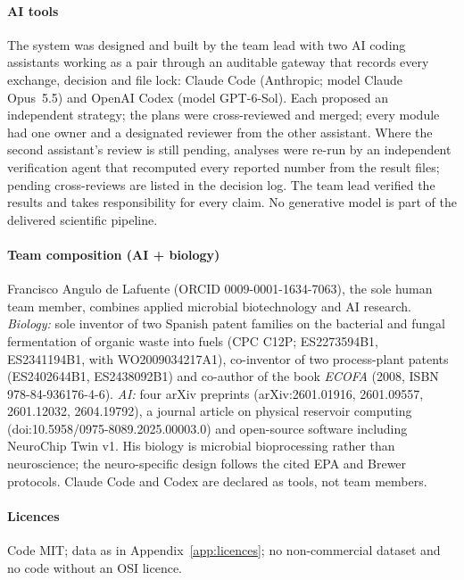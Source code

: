 \documentclass[11pt,a4paper]{article}
\newcommand{\appref}[1]{Appendix~\ref{#1}}
\begin{document}
\paragraph{AI tools}
The system was designed and built by the team lead with two AI coding assistants working as a pair through an
auditable gateway that records every exchange, decision and file lock: Claude Code (Anthropic; model Claude Opus~5.5)
and OpenAI Codex (model GPT-6-Sol). Each proposed an independent strategy; the plans were cross-reviewed and
merged; every module had one owner and a designated reviewer from the other assistant. Where the second
assistant's review is still pending, analyses were re-run by an independent verification agent that recomputed every
reported number from the result files; pending cross-reviews are listed in the decision log. The team lead verified
the results and
takes responsibility for every claim. No generative model is part of the delivered scientific pipeline.

\paragraph{Team composition (AI + biology)}
Francisco Angulo de Lafuente (ORCID 0009-0001-1634-7063), the sole human team member, combines applied
microbial biotechnology and AI research. \emph{Biology:} sole inventor of two Spanish patent families on the
bacterial and fungal fermentation of organic waste into fuels (CPC C12P; ES2273594B1, ES2341194B1, with
WO2009034217A1), co-inventor of two process-plant patents (ES2402644B1, ES2438092B1) and co-author of the book
\emph{ECOFA} (2008, ISBN 978-84-936176-4-6). \emph{AI:} four arXiv preprints
(arXiv:2601.01916, 2601.09557, 2601.12032, 2604.19792), a journal article on physical reservoir computing (doi:10.5958/0975-8089.2025.00003.0)
and open-source software including NeuroChip Twin v1. His biology is microbial bioprocessing rather than
neuroscience; the neuro-specific design follows the cited EPA and Brewer protocols. Claude Code and Codex are
declared as tools, not team members.

\paragraph{Licences}
Code MIT; data as in \appref{app:licences}; no non-commercial dataset and no code without an OSI licence.
\end{document}
